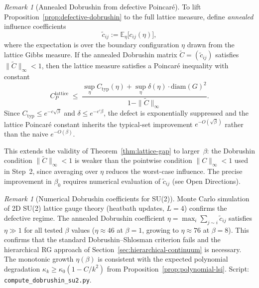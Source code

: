 \documentclass[12pt,a4paper]{article}
\theoremstyle{definition}
\theoremstyle{plain}
\theoremstyle{remark}
\newtheorem{remark}[definition]{Remark}
\begin{document}
\begin{remark}[Annealed Dobrushin from defective Poincar\'e]\label{rem:annealed-dobrushin}
To lift Proposition~\ref{prop:defective-dobrushin} to the full lattice measure, define \emph{annealed} influence coefficients
\begin{equation}\label{eq:annealed-influence}
  \tilde{c}_{ij} := \mathbb{E}_\eta\bigl[c_{ij}(\eta)\bigr],
\end{equation}
where the expectation is over the boundary configuration $\eta$ drawn from the lattice Gibbs measure. If the annealed Dobrushin matrix $\tilde{C} = (\tilde{c}_{ij})$ satisfies $\|\tilde{C}\|_\infty < 1$, then the lattice measure satisfies a Poincar\'e inequality with constant
\begin{equation}\label{eq:annealed-poincare}
  C_P^{\mathrm{lattice}} \;\leq\; \frac{\sup_\eta C_{\mathrm{typ}}(\eta) + \sup_\eta \delta(\eta) \cdot \mathrm{diam}(G)^2}{1 - \|\tilde{C}\|_\infty}.
\end{equation}
Since $C_{\mathrm{typ}} \leq e^{-c\sqrt{\beta}}$ and $\delta \leq e^{-c'\beta}$, the defect is exponentially suppressed and the lattice Poincar\'e constant inherits the typical-set improvement $e^{-O(\sqrt{\beta})}$ rather than the naive $e^{-O(\beta)}$.

This extends the validity of Theorem~\ref{thm:lattice-gap} to larger~$\beta$: the Dobrushin condition $\|\tilde{C}\|_\infty < 1$ is weaker than the pointwise condition $\|C\|_\infty < 1$ used in Step~2, since averaging over $\eta$ reduces the worst-case influence. The precise improvement in $\beta_0$ requires numerical evaluation of $\tilde{c}_{ij}$ (see Open Directions).
\end{remark}

\begin{remark}[Numerical Dobrushin coefficients for SU(2)]
\label{rem:dobrushin-numerics}
Monte Carlo simulation of 2D SU(2) lattice gauge theory (heatbath updates, $L=4$) confirms the defective regime. The annealed Dobrushin coefficient $\eta = \max_i \sum_{j \sim i} \tilde{c}_{ij}$ satisfies $\eta \gg 1$ for all tested $\beta$ values ($\eta \approx 46$ at $\beta=1$, growing to $\eta \approx 76$ at $\beta=8$). This confirms that the standard Dobrushin--Shlosman criterion fails and the hierarchical RG approach of Section~\ref{sec:hierarchical-continuum} is necessary. The monotonic growth $\eta(\beta)$ is consistent with the expected polynomial degradation $\kappa_k \geq \kappa_0(1 - C/k^2)$ from Proposition~\ref{prop:polynomial-lsi}. Script: \texttt{compute\_dobrushin\_su2.py}.
\end{remark}
\end{document}
